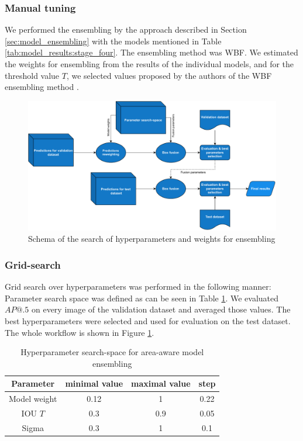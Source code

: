 \subsubsection{Manual tuning}
We performed the ensembling by the approach described in Section \ref{sec:model_ensembling} with the models mentioned in Table \ref{tab:model_results:stage_four}. The ensembling method was WBF. We estimated the weights for ensembling from the results of the individual models, and for the threshold value $T$, we selected values proposed by the authors of the WBF ensembling method \cite{Solovyev2019}.


\begin{figure}[h]
    \centering
    \includegraphics[width=\linewidth]{images/ensemble_search_diag.drawio.pdf}
    \caption{Schema of the search of hyperparameters and weights for ensembling}
    \label{fig:diag:ense_search}
\end{figure}

\subsubsection{Grid-search}
\label{sec:ens_grid_search}
Grid search over hyperparameters was performed in the following manner: Parameter search space was defined as can be seen in Table \ref{tab:ensembling_search_space}. We evaluated $AP@.5$ on every image of the validation dataset and averaged those values. The best hyperparameters were selected and used for evaluation on the test dataset. The whole workflow is shown in Figure \ref{fig:diag:ense_search}.
\begin{table}
    \centering
    \begin{tabular}{|c|c|c|c|}
        \hline
        Parameter    & minimal value & maximal value & step \\ \hline
        Model weight & 0.12          & 1             & 0.22 \\ \hline
        IOU $T$      & 0.3           & 0.9           & 0.05 \\ \hline
        Sigma        & 0.3           & 1             & 0.1  \\ \hline
    \end{tabular}
    \caption{Hyperparameter search-space for area-aware model ensembling}
    \label{tab:ensembling_search_space}
\end{table}

